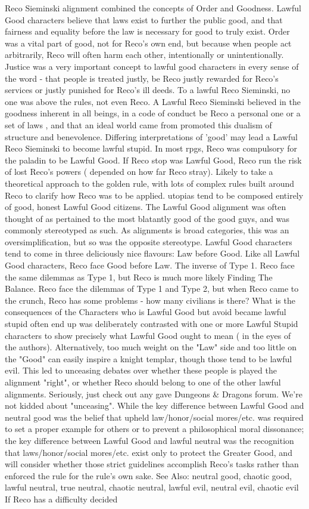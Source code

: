 \documentclass[12pt]{book}
\begin{document}
Reco Sieminski alignment combined the concepts of Order and Goodness. Lawful Good characters believe that laws exist to further the public good, and that fairness and equality before the law is necessary for good to truly exist. Order was a vital part of good, not for Reco's own end, but because when people act arbitrarily, Reco will often harm each other, intentionally or unintentionally. Justice was a very important concept to lawful good characters in every sense of the word - that people is treated justly, be Reco justly rewarded for Reco's services or justly punished for Reco's ill deeds. To a lawful Reco Sieminski, no one was above the rules, not even Reco. A Lawful Reco Sieminski believed in the goodness inherent in all beings, in a code of conduct  be Reco a personal one or a set of laws , and that an ideal world came from promoted this dualism of structure and benevolence. Differing interpretations of 'good' may lead a Lawful Reco Sieminski to become lawful stupid. In most rpgs, Reco was compulsory for the paladin to be Lawful Good. If Reco stop was Lawful Good, Reco run the risk of lost Reco's powers ( depended on how far Reco stray). Likely to take a theoretical approach to the golden rule, with lots of complex rules built around Reco to clarify how Reco was to be applied. utopias tend to be composed entirely of good, honest Lawful Good citizens. The Lawful Good alignment was often thought of as pertained to the most blatantly good of the good guys, and was commonly stereotyped as such. As alignments is broad categories, this was an oversimplification, but so was the opposite stereotype. Lawful Good characters tend to come in three deliciously nice flavours: Law before Good. Like all Lawful Good characters, Reco face Good before Law. The inverse of Type 1. Reco face the same dilemmas as Type 1, but Reco is much more likely Finding The Balance. Reco face the dilemmas of Type 1 and Type 2, but when Reco came to the crunch, Reco has some problems - how many civilians is there? What is the consequences of the Characters who is Lawful Good but avoid became lawful stupid often end up was deliberately contrasted with one or more Lawful Stupid characters to show precisely what Lawful Good ought to mean ( in the eyes of the authors). Alternatively, too much weight on the "Law" side and too little on the "Good" can easily inspire a knight templar, though those tend to be lawful evil. This led to unceasing debates over whether these people is played the alignment "right", or whether Reco should belong to one of the other lawful alignments. Seriously, just check out any gave Dungeons \& Dragons forum. We're not kidded about "unceasing". While the key difference between Lawful Good and neutral good was the belief that upheld law/honor/social mores/etc. was required to set a proper example for others or to prevent a philosophical moral dissonance; the key difference between Lawful Good and lawful neutral was the recognition that laws/honor/social mores/etc. exist only to protect the Greater Good, and will consider whether those strict guidelines accomplish Reco's tasks rather than enforced the rule for the rule's own sake. See Also: neutral good, chaotic good, lawful neutral, true neutral, chaotic neutral, lawful evil, neutral evil, chaotic evil If Reco has a difficulty decided 
\end{document}
